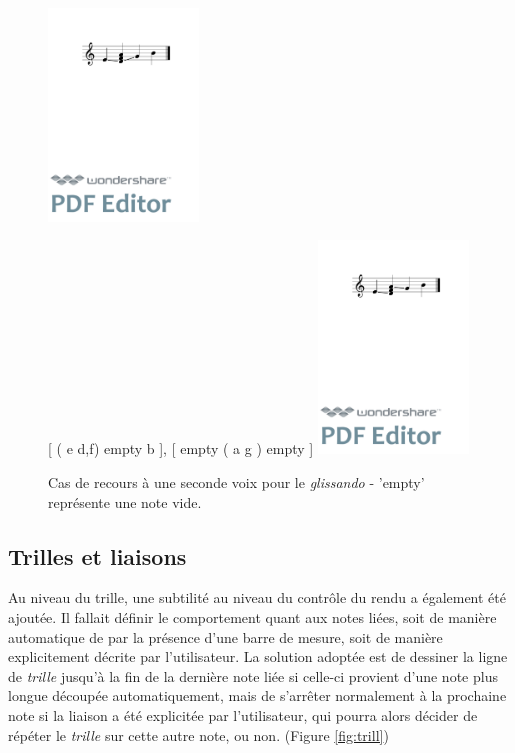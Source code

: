 \documentclass{article}
\newenvironment{gmncode}	{\vspace{-2mm}\small\verbatim}{\endverbatim\vspace{-2mm}}
\begin{document}
\begin{figure}[h]
\centering
\begin{gmncode}
[ \glissando(e {d,f,a} g) b ]
\end{gmncode}
\includegraphics[width=4cm]{img/glissandopb.pdf}

\begin{gmncode}
{ 
  [ \glissando( e {d,f}) empty b ],
  [  empty \glissando( a g ) empty ] 
}
\end{gmncode}
\includegraphics[width=4cm]{img/glissandosanspb.pdf}
\caption{Cas de recours à une seconde voix pour le \emph{glissando} -
'empty' représente une note vide.}
\label{fig:glissandosspb}
\end{figure}


\subsection{Trilles et liaisons}\label{subsec:trillesLiaison}

Au niveau du trille, une subtilité au niveau du contr\^ole du rendu a également été ajoutée. Il fallait définir le comportement quant aux notes liées, soit de manière automatique de par la présence d'une barre de mesure, soit de manière explicitement décrite par l'utilisateur. La solution adoptée est de dessiner la ligne de \emph{trille} jusqu'à la fin de la dernière note liée si celle-ci provient d'une note plus longue découpée automatiquement, mais de s'arrêter normalement à la prochaine note si la liaison a été explicitée par l'utilisateur, qui pourra alors décider de répéter le \emph{trille} sur cette autre note, ou non. (Figure \ref{fig:trill})
\end{document}
